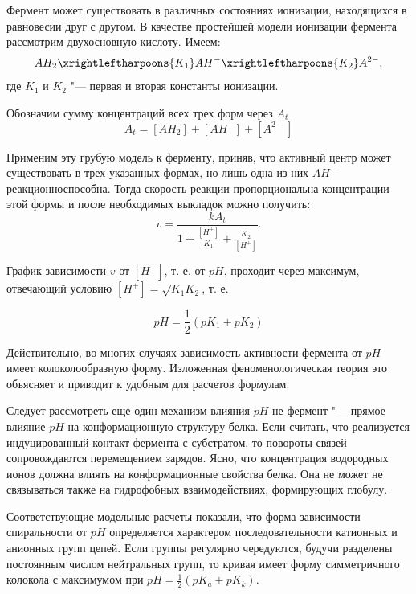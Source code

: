 \documentclass[12pt,a4paper,oneside]{book}
\begin{document}
Фермент может существовать в различных состояниях ионизации, находящихся в равновесии друг с другом. В качестве простейшей модели ионизации фермента рассмотрим двухосновную кислоту. Имеем:
\begin{align}
AH_2 \xrightleftharpoons{K_1} AH^- \xrightleftharpoons {K_2} A^{2-},
\end{align}
где $ K_1 $ и $ K_2 $ "--- первая и вторая константы ионизации.

Обозначим сумму концентраций всех трех форм через $ A_t $
\begin{equation}
A_t=[AH_2]+[AH^-]+[A^{2-}]
\end{equation}

Применим эту грубую модель к ферменту, приняв, что активный центр может существовать в трех указанных формах, но лишь одна из них $AH^- $ реакционноспособна. Тогда скорость реакции пропорциональна концентрации этой формы и после необходимых выкладок можно получить:
\begin{equation}
	v = \dfrac{k A_t}{1+\frac{[H^+]}{K_1}+\frac{K_2}{[H^+]}}.
\end{equation}

График зависимости $ v $ от $ [ H^+ ] $, т. е. от $ pH  $, проходит через максимум, отвечающий условию $ [ H^+ ] = \sqrt{K_1K_2} $, т. е.

\begin{equation}
	pH =\frac{1}{2} (pK_1 + pK_2)
\end{equation}

Действительно, во многих случаях зависимость активности фермента от $pH$ имеет колоколообразную форму. Изложенная феноменологическая теория это объясняет и приводит к удобным для расчетов формулам.

Следует рассмотреть еще один механизм влияния $pH$ не фермент "--- прямое влияние $pH$ на конформационную структуру белка. Если считать, что реализуется индуцированный контакт фермента с субстратом, то повороты связей сопровождаются перемещением зарядов. Ясно, что концентрация водородных ионов должна влиять на конформационные свойства белка. Она не может не связываться также на гидрофобных взаимодействиях, формирующих глобулу. 

Соответствующие модельные расчеты показали, что форма зависимости  спиральности от $pH$ определяется характером последовательности катионных и анионных групп цепей. Если группы регулярно чередуются, будучи разделены постоянным числом нейтральных групп, то кривая имеет форму симметричного колокола с максимумом при $ pH = \frac{1}{2} ( pK_a + pK_k ) $. 
\end{document}
